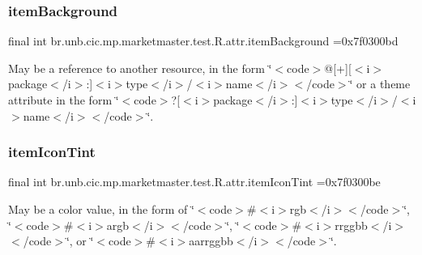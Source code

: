 \subsubsection{\texorpdfstring{item\+Background}{itemBackground}}
{\footnotesize\ttfamily final int br.\+unb.\+cic.\+mp.\+marketmaster.\+test.\+R.\+attr.\+item\+Background =0x7f0300bd\hspace{0.3cm}{\ttfamily [static]}}

May be a reference to another resource, in the form \char`\"{}$<$code$>$@\mbox{[}+\mbox{]}\mbox{[}$<$i$>$package$<$/i$>$\+:\mbox{]}$<$i$>$type$<$/i$>$/$<$i$>$name$<$/i$>$$<$/code$>$\char`\"{} or a theme attribute in the form \char`\"{}$<$code$>$?\mbox{[}$<$i$>$package$<$/i$>$\+:\mbox{]}$<$i$>$type$<$/i$>$/$<$i$>$name$<$/i$>$$<$/code$>$\char`\"{}. \mbox{\label{classbr_1_1unb_1_1cic_1_1mp_1_1marketmaster_1_1test_1_1R_1_1attr_ad4d48d748eac3486b26789140fdac36d}} 
\subsubsection{\texorpdfstring{item\+Icon\+Tint}{itemIconTint}}
{\footnotesize\ttfamily final int br.\+unb.\+cic.\+mp.\+marketmaster.\+test.\+R.\+attr.\+item\+Icon\+Tint =0x7f0300be\hspace{0.3cm}{\ttfamily [static]}}

May be a color value, in the form of \char`\"{}$<$code$>$\#$<$i$>$rgb$<$/i$>$$<$/code$>$\char`\"{}, \char`\"{}$<$code$>$\#$<$i$>$argb$<$/i$>$$<$/code$>$\char`\"{}, \char`\"{}$<$code$>$\#$<$i$>$rrggbb$<$/i$>$$<$/code$>$\char`\"{}, or \char`\"{}$<$code$>$\#$<$i$>$aarrggbb$<$/i$>$$<$/code$>$\char`\"{}. \mbox{\label{classbr_1_1unb_1_1cic_1_1mp_1_1marketmaster_1_1test_1_1R_1_1attr_a7f2198739bc83e950edd4c5525e34d22}} 
